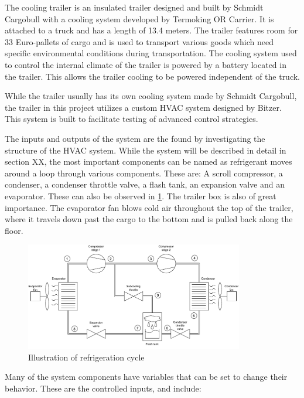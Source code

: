 The cooling trailer is an insulated trailer designed and built by Schmidt Cargobull with a cooling system developed by Termoking OR Carrier. It is attached to a truck and has a length of 13.4 meters. The trailer features room for 33 Euro-pallets of cargo and is used to transport various goods which need specific environmental conditions during transportation. The cooling system used to control the internal climate of the trailer is powered by a battery located in the trailer. This allows the trailer cooling to be powered independent of the truck.

While the trailer usually has its own cooling system made by Schmidt Cargobull, the trailer in this project utilizes a custom HVAC system designed by Bitzer. This system is built to facilitate testing of advanced control strategies.

The inputs and outputs of the system are the found by investigating the structure of the HVAC system. While the system will be described in detail in section XX, the most important components can be named as refrigerant moves around a loop through various components. These are: A scroll compressor, a condenser, a condenser throttle valve, a flash tank, an expansion valve and an evaporator. These can also be observed in \cref{fig:HVAC_Diagram}. The trailer box is also of great importance. 
The evaporator fan blows cold air throughout the top of the trailer, where it travels down past the cargo to the bottom and is pulled back along the floor.

\begin{figure}[h!]
	\centering
	\includegraphics[width=0.85\textwidth]{Graphics/HVAC_Diagram_Fans.pdf}
	\caption{Illustration of refrigeration cycle}
	\label{fig:HVAC_Diagram}
\end{figure}

Many of the system components have variables that can be set to change their behavior. These are the controlled inputs, and include:

